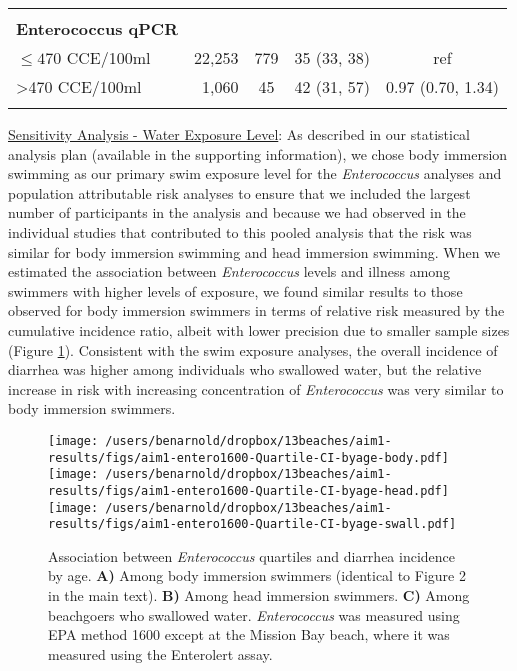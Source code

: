 \documentclass[12pt]{article}\usepackage[]{graphicx}\usepackage[]{color}
\begin{document}
\begin{table}[h!tb]
\begin{center}
\begin{footnotesize}
\begin{tabular}{l rc c c}
& \\
\textbf{Enterococcus qPCR} \\
 $\leq470$ CCE/100ml & 22,253 &    779 & 35 (33, 38) & ref \\ 
  >470 CCE/100ml &  1,060 &     45 & 42 (31, 57) & 0.97 (0.70, 1.34) \\ 
  
& \\
\hline
\end{tabular}
\end{footnotesize}
\end{center}
\end{table}



\clearpage
\underline{Sensitivity Analysis - Water Exposure Level}: As described in our statistical analysis plan (available in the supporting information), we chose body immersion swimming as our primary swim exposure level for the \emph{Enterococcus} analyses and population attributable risk analyses to ensure that we included the largest number of participants in the analysis and because we had observed in the individual studies that contributed to this pooled analysis that the risk was similar for body immersion swimming and head immersion swimming. When we estimated the association between \emph{Enterococcus} levels and illness among swimmers with higher levels of exposure, we found similar results to those observed for body immersion swimmers in terms of relative risk measured by the cumulative incidence ratio, albeit with lower precision due to smaller sample sizes (Figure \ref{fig:enterosens}). Consistent with the swim exposure analyses, the overall incidence of diarrhea was higher among individuals who swallowed water, but the relative increase in risk with increasing concentration of \emph{Enterococcus} was very similar to body immersion swimmers.

\begin{figure}[h!tb]
\begin{center}
\texttt{[image: /users/benarnold/dropbox/13beaches/aim1-results/figs/aim1-entero1600-Quartile-CI-byage-body.pdf]} \\
\texttt{[image: /users/benarnold/dropbox/13beaches/aim1-results/figs/aim1-entero1600-Quartile-CI-byage-head.pdf]} \\
\texttt{[image: /users/benarnold/dropbox/13beaches/aim1-results/figs/aim1-entero1600-Quartile-CI-byage-swall.pdf]}
\caption{Association between \emph{Enterococcus} quartiles and diarrhea incidence by age. \textbf{A)} Among body immersion swimmers (identical to Figure 2 in the main text). \textbf{B)} Among head immersion swimmers. \textbf{C)} Among beachgoers who swallowed water. \emph{Enterococcus} was measured using EPA method 1600 except at the Mission Bay beach, where it was measured using the Enterolert assay. \label{fig:enterosens}}
\end{center}
\end{figure}
\end{document}
